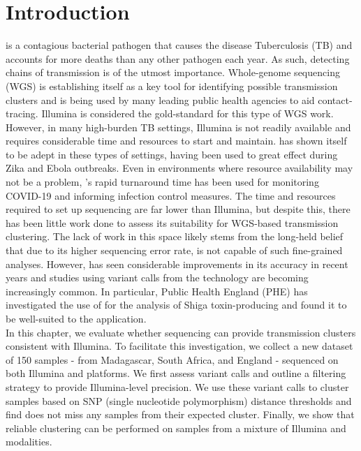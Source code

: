 
\section{Introduction}
\mtb{} is a contagious bacterial pathogen that causes the disease Tuberculosis (TB) and accounts for more deaths than any other pathogen each year. As such, detecting chains of \mtb{} transmission is of the utmost importance. Whole-genome sequencing (WGS) is establishing itself as a key tool for identifying possible transmission clusters and is being used by many leading public health agencies to aid contact-tracing. Illumina is considered the gold-standard for this type of WGS work. However, in many high-burden TB settings, Illumina is not readily available and requires considerable time and resources to start and maintain. \ont{} has shown itself to be adept in these types of settings, having been used to great effect during Zika and Ebola outbreaks. Even in environments where resource availability may not be a problem, \ont{}'s rapid turnaround time has been used for monitoring COVID-19 and informing infection control measures. The time and resources required to set up \ont{} sequencing are far lower than Illumina, but despite this, there has been little work done to assess its suitability for \mtb{} WGS-based transmission clustering. The lack of work in this space likely stems from the long-held belief that due to its higher sequencing error rate, \ont{} is not capable of such fine-grained analyses. However, \ont{} has seen considerable improvements in its accuracy in recent years and studies using variant calls from the technology are becoming increasingly common. In particular, Public Health England (PHE) has investigated the use of \ont{} for the analysis of Shiga toxin-producing \ecoli{} and found it to be well-suited to the application. \\
In this chapter, we evaluate whether \ont{} sequencing can provide \mtb{} transmission clusters consistent with Illumina. To facilitate this investigation, we collect a new dataset of 150 samples - from Madagascar, South Africa, and England - sequenced on both Illumina and \ont{} platforms. We first assess \ont{} variant calls and outline a filtering strategy to provide Illumina-level precision. We use these variant calls to cluster samples based on SNP (single nucleotide polymorphism) distance thresholds and find \ont{} does not miss any samples from their expected cluster. Finally, we show that reliable clustering can be performed on samples from a mixture of Illumina and \ont{} modalities. \\
